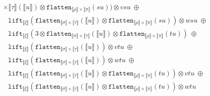 \documentclass[runningheads,a4paper]{llncs}
\newcommand{\typeinterpret}[1]{\llbracket #1 \rrbracket}
\newcommand{\interpret}[1]{\llbracket #1 \rrbracket}
\newcommand{\flatten}{\mathtt{flatten}}
\newcommand{\lift}{\mathtt{lift}}
\begin{document}
\begin{itemize}
\[\begin{array}{l}
{    \times \typeinterpret{\tau}}(\interpret{u}) \otimes
    \flatten_{\typeinterpret{\rho} \times
    \typeinterpret{\pi}}(su)) \otimes vsu\ \oplus \\
  \phantom{A}
    \lift_{\typeinterpret{\xi}}(\flatten_{\typeinterpret{\sigma}
    \times \typeinterpret{\tau}}(\interpret{u}) \otimes
    \flatten_{\typeinterpret{\rho}
    \times \typeinterpret{\pi}}(su)) \otimes wsu\ \oplus \\
  \phantom{A}
    \lift_{\typeinterpret{\xi}}(3 \otimes \flatten_{
    \typeinterpret{\sigma} \times \typeinterpret{\tau}}(
    \interpret{u}) \otimes \flatten_{
    \typeinterpret{\rho} \times \typeinterpret{\pi}}(tu))\ \oplus \\
  \phantom{A}
    \lift_{\typeinterpret{\xi}}(\flatten_{\typeinterpret{\sigma}
    \times \typeinterpret{\tau}}(\interpret{u})) \otimes vtu\ \oplus \\
  \phantom{A}
    \lift_{\typeinterpret{\xi}}(\flatten_{\typeinterpret{\sigma}
    \times \typeinterpret{\tau}}(\interpret{u})) \otimes wtu\ \oplus \\
  \phantom{A}
    \lift_{\typeinterpret{\xi}}(\flatten_{\typeinterpret{\sigma}
    \times \typeinterpret{\tau}}(\interpret{u}) \otimes
    \flatten_{\typeinterpret{\rho} \times
    \typeinterpret{\pi}}(tu)) \otimes vtu\ \oplus \\
  \phantom{A}
    \lift_{\typeinterpret{\xi}}(\flatten_{\typeinterpret{\sigma}
    \times \typeinterpret{\tau}}(\interpret{u}) \otimes
    \flatten_{\typeinterpret{\rho}
    \times \typeinterpret{\pi}}(tu)) \otimes wtu
  \end{array}
  \]


\end{itemize}
\end{document}

